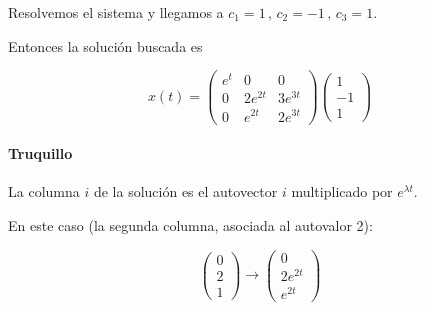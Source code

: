 \documentclass[nochap]{apuntes}
\begin{document}
\begin{problem}[26]
Resolvemos el sistema y llegamos a $c_1=1\,,\,c_2=-1\,,\,c_3=1$.

Entonces la solución buscada es

\[x(t) = \begin{pmatrix}
e^t&0&0\\
0 &2e^{2t}&3e^{3t}\\
0&e^{2t}&2e^{3t}
\end{pmatrix}\begin{pmatrix}
1\\-1\\1
\end{pmatrix}\]

\paragraph{Truquillo}
La columna $i$ de la solución es el autovector $i$  multiplicado por $e^{\lambda t}$. 

En este caso (la segunda columna, asociada al autovalor 2):

\[\begin{pmatrix}
0\\2\\1
\end{pmatrix} \to \begin{pmatrix}
0\\2e^{2t}\\e^{2t}
\end{pmatrix}
\]

\end{problem}
\end{document}
